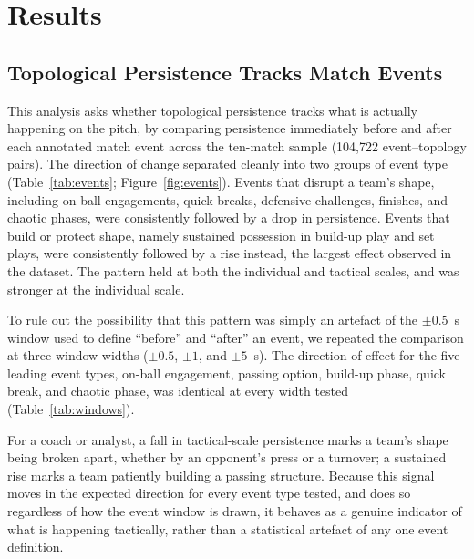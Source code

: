 \section{Results}

\subsection{Topological Persistence Tracks Match Events}

This analysis asks whether topological persistence tracks what is
actually happening on the pitch, by comparing persistence immediately
before and after each annotated match event across the ten-match sample
(104{,}722 event--topology pairs). The direction of change separated
cleanly into two groups of event type (Table~\ref{tab:events};
Figure~\ref{fig:events}). Events that disrupt a team's shape, including on-ball engagements, quick breaks, defensive challenges, finishes, and chaotic phases, were consistently followed by a drop in persistence. Events
that build or protect shape, namely sustained possession in build-up play and set plays, were consistently followed by a rise instead, the
largest effect observed in the dataset. The pattern held at both the
individual and tactical scales, and was stronger at the individual
scale.

To rule out the possibility that this pattern was simply an artefact of
the $\pm0.5$~s window used to define ``before'' and ``after'' an event,
we repeated the comparison at three window widths ($\pm0.5$, $\pm1$, and
$\pm5$~s). The direction of effect for the five leading event types,
on-ball engagement, passing option, build-up phase, quick break, and
chaotic phase, was identical at every width tested
(Table~\ref{tab:windows}).

For a coach or analyst, a fall in tactical-scale persistence marks a
team's shape being broken apart, whether by an opponent's press or a
turnover; a sustained rise marks a team patiently building a passing
structure. Because this signal moves in the expected direction for
every event type tested, and does so regardless of how the event window
is drawn, it behaves as a genuine indicator of what is happening
tactically, rather than a statistical artefact of any one event
definition.

